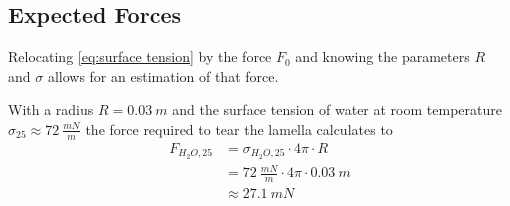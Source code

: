         \subsection{Expected Forces}\label{sec:A10 expected forces}%
        Relocating \cref{eq:surface tension} by the force \(F_0\) and knowing the parameters \(R\) and \(\sigma\) allows
        for an estimation of that force.\par
        With a radius \(R = \SI{0.03}{m}\) and the surface tension of water at room temperature \(\sigma_{25} \approx \SI{72}{\frac{mN}{m}}\) \cite{surface.tension.of.pure.water.Pallas.Harrison.1990}
        the force required to tear the lamella calculates to
        \begin{align}
            F_{H_2O,25} &= \sigma_{H_2O,25} \cdot 4\pi \cdot R \nonumber \\
                        &= \SI{72}{\frac{mN}{m}} \cdot 4\pi \cdot \SI{0.03}{m} \nonumber \\
                        &\approx \SI{27.1}{mN}
        \end{align}
